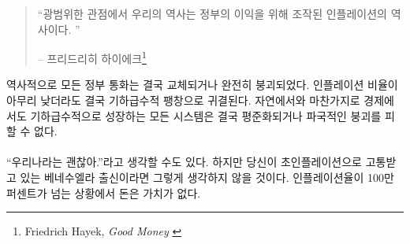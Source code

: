\begin{quotation}\begin{samepage}
		\enquote{광범위한 관점에서 우리의 역사는 정부의 이익을 위해 조작된 인플레이션의 역사이다. }
		\begin{flushright} -- 프리드리히 하이에크\footnote{Friedrich Hayek, \textit{Good Money} \cite{hayek-good-money}}
\end{flushright}\end{samepage}\end{quotation}

역사적으로 모든 정부 통화는 결국 교체되거나 완전히 붕괴되었다. 
인플레이션 비율이 아무리 낮더라도 결국 기하급수적 팽창으로 귀결된다. 
자연에서와 마찬가지로 경제에서도 기하급수적으로 성장하는 
모든 시스템은 결국 평준화되거나 파국적인 붕괴를 피할 수 없다.

\paragraph{}
\enquote{우리나라는 괜찮아.}라고 생각할 수도 있다.
하지만 당신이 초인플레이션으로 고통받고 있는 베네수엘라 출신이라면 그렇게 생각하지 않을 것이다. 
인플레이션율이 100만 퍼센트가 넘는 상황에서 돈은 가치가 없다.\cite{wiki:venezuela}

